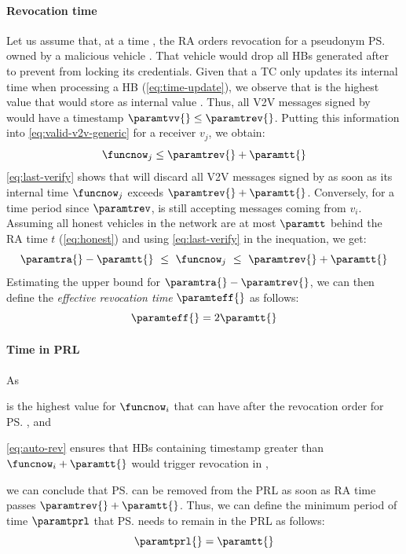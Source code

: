 \paragraph{Revocation time}
%
Let us assume that, at a time \paramtrev{}, the \ac{RA} orders revocation for a
pseudonym \ps{} owned by a malicious vehicle . That vehicle would
drop all \acp{HB} generated after \paramtrev{} to prevent  from locking
its credentials. Given that a \ac{TC} only updates its internal time when
processing a \ac{HB} (\cref{eq:time-update}), we observe that \paramtrev{} is
the highest value that  would store as internal value \funcnow. Thus, all
\ac{V2V} messages signed by  would have a timestamp $\paramtvv{}\leq
\paramtrev{}$. Putting this information into \cref{eq:valid-v2v-generic} for a
receiver $v_j$, we obtain:
%
\begin{equation}
    \label{eq:last-verify}
    \funcnow_j \leq \paramtrev{} + \paramtt{}
\end{equation}
%
\cref{eq:last-verify} shows that  will discard all \ac{V2V} messages
signed by  as soon as its internal time $\funcnow_j$ exceeds $\paramtrev{}
+ \paramtt{}$. Conversely, for a time period \paramtt{} since $\paramtrev$,
 is still accepting messages coming from $v_i$. Assuming all honest
vehicles in the network are at most $\paramtt$ behind the RA time $t$ (\cref{eq:honest}) and
using \cref{eq:last-verify} in the inequation, we get:
\begin{equation}
    \label{eq:estimate-teff}
    \paramtra{} - \paramtt{} \ \leq\ \funcnow_j\ \leq\  \paramtrev{} + \paramtt{}
\end{equation}
Estimating the upper bound for $\paramtra{}-\paramtrev{}$, we can then define
the \emph{effective revocation time} $\paramteff{}$ as follows:
%
\begin{equation}
    \label{eq:effective-revocation}
    \paramteff{} =  2\paramtt{}
\end{equation}
%

\paragraph{Time in PRL}
%
As %
%
\begin{paraenum}
    \item \paramtrev{} is the highest value for $\funcnow_i$ that  can
      have after the revocation order for \ps, and
    \item \cref{eq:auto-rev} ensures that \acp{HB} containing timestamp
      \paramthb{} greater than $\funcnow_i + \paramtt{}$ would trigger
      revocation in ,
\end{paraenum}
%
we can conclude that \ps{} can be removed from the \ac{PRL} as soon as
\ac{RA} time \paramtra{} passes $\paramtrev{} + \paramtt{}$. Thus, we can
define the minimum period of time $\paramtprl$ that \ps{} needs to remain in
the \ac{PRL} as follows:
%
\begin{equation}
    \label{eq:t-prl}
    \paramtprl{} = \paramtt{}
\end{equation}


